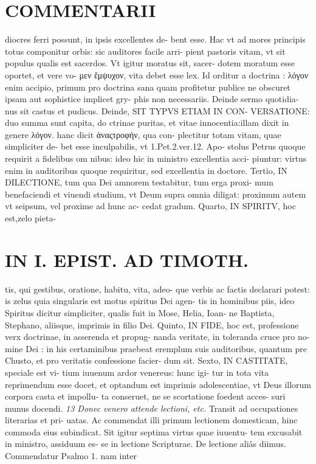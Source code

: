 \documentclass{article}
\begin{document}
\begin{pages}
\section*{COMMENTARII }
\marginpar{[ p.108 ]}\pstart diocres ferri possunt, in ipsis excellentes de- bent esse. Hac vt ad mores principis totus componitur orbis: sic auditores facile arri- pient pastoris vitam, vt sit populus qualis est sacerdos. Vt igitur moratus sit, sacer- dotem moratum esse oportet, et vere vo- μεν ἔμψυχον, vita debet esse lex. Id orditur a doctrina : λόγον enim accipio, primum pro doctrina sana quam profitetur publice ne obscuret ipsam aut sophistice implicet gry- phis non necessariis. Deinde sermo quotidia- nus sit castus et pudicus.  \pend\pstart Deinde, SIT TYPVS ETIAM IN CON- VERSATIONE: duo summa sunt capita, do ctrinae puritas, et vitae innocentia:illam dixit in genere λόγον. hanc dicit ἀναςτροφήν, qua con- plectitur totam vitam, quae simpliciter de- bet esse inculpabilis, vt 1.Pet.2.ver.12. Apo- stolus Petrus quoque requirit a fidelibus om nibus: ideo hic in ministro excellentia acci- piuntur: virtus enim in auditoribus quoque requiritur, sed excellentia in doctore.  \pend\pstart Tertio, IN DILECTIONE, tum qua Dei amnorem testabitur, tum erga proxi- mum benefaciendi et viuendi studium, vt Deum supra omnia diligat: proximum autem vt seipsum, vel proxime ad hunc ac- cedat gradum.  \pend\pstart Quarto, IN SPIRITV, hoc est,zelo pieta-  \pend
\section*{IN I. EPIST. AD TIMOTH. }
\marginpar{[ p.109 ]}\pstart tis, qui gestibus, oratione, habitu, vita, adeo- que verbis ac factis declarari potest: is zelus quia singularis est motus spiritus Dei agen- tis in hominibus piis, ideo Spiritus dicitur simpliciter, qualis fuit in Mose, Helia, Ioan- ne Baptista, Stephano, aliisque, imprimis in filio Dei.  \pend\pstart Quinto, IN FIDE, hoc est, professione verx doctrinae, in asserenda et propug- nanda veritate, in toleranda cruce pro no- mine Dei : in his certaminibus praebeat eremplum suis auditoribus, quantum pre Chusto, et pro veritatis confessione facier- dum sit.  \pend\pstart Sexto, IN CASTITATE, speciale est vi- tium iuuenum ardor venereus: hunc igi- tur in tota vita reprimendum esse docet, et optandum est imprimis adolescentiae, vt Deus illorum corpora casta et impollu- ta conseruet, ne se scortatione foedent acces- suri munus docendi.  \pend
\textit{13 Donec venero attende lectioni, etc. }\pstart Transit ad occupationes literarias et pri- uatas. Ac commendat illi primum lectionem domesticam, hinc commoda eius subindicat. Sit igitur septima virtus quae iuuentu- tem excusabit in ministro, assiduum es- se in lectione Scripturae. De lectione aliâs diimus. Commendatur Psalmo 1. nam inter  \pend

\end{pages}
\end{document}

